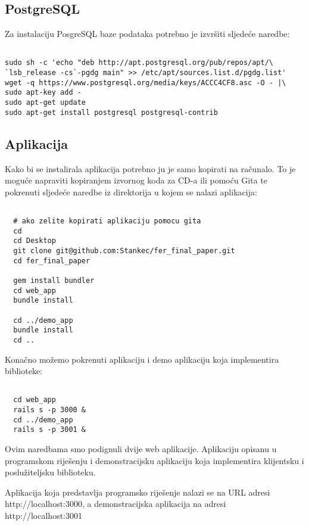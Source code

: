 \documentclass[times, utf8, zavrsni]{fer}
\begin{document}
\subsection{PostgreSQL}
Za instalaciju PosgreSQL baze podataka potrebno je izvršiti sljedeće naredbe:

\begin{lstlisting}

sudo sh -c 'echo "deb http://apt.postgresql.org/pub/repos/apt/\
`lsb_release -cs`-pgdg main" >> /etc/apt/sources.list.d/pgdg.list'
wget -q https://www.postgresql.org/media/keys/ACCC4CF8.asc -O - |\
sudo apt-key add -
sudo apt-get update
sudo apt-get install postgresql postgresql-contrib

\end{lstlisting}

\subsection{Aplikacija}
Kako bi se instalirala aplikacija potrebno ju je samo kopirati na računalo.
To je moguće napraviti kopiranjem izvornog koda za CD-a ili pomoću Gita te
pokrenuti sljedeće naredbe iz direktorija u kojem se nalazi aplikacija:

\begin{lstlisting}

  # ako zelite kopirati aplikaciju pomocu gita
  cd
  cd Desktop
  git clone git@github.com:Stankec/fer_final_paper.git
  cd fer_final_paper

  gem install bundler
  cd web_app
  bundle install

  cd ../demo_app
  bundle install
  cd ..

\end{lstlisting}

Konačno možemo pokrenuti aplikaciju i demo aplikaciju koja implementira
biblioteke:

\begin{lstlisting}

  cd web_app
  rails s -p 3000 &
  cd ../demo_app
  rails s -p 3001 &

\end{lstlisting}

Ovim naredbama smo podignuli dvije web aplikacije. Aplikaciju opisanu u
programskom riješenju i demonstracijsku aplikaciju koja implementira klijentsku
i poslužiteljsku biblioteku.

Aplikacija koja predstavlja programsko riješenje nalazi se na URL adresi
http://localhost:3000, a demonstracijska aplikacija na adresi
http://localhost:3001
\end{document}
